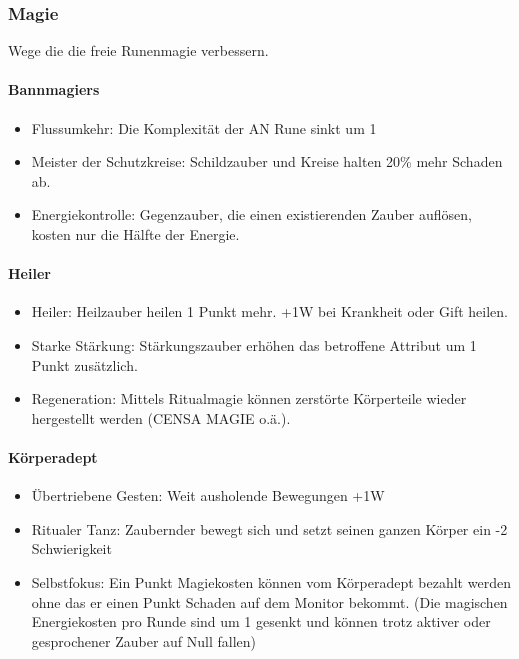 \documentclass{article}
\begin{document}
\subsubsection{Magie}

Wege die die freie Runenmagie verbessern.

\paragraph{Bannmagiers}

\begin{itemize}
\item Flussumkehr: Die Komplexität der AN Rune sinkt um 1
\item Meister der Schutzkreise: Schildzauber und Kreise halten 20\% mehr Schaden ab.
\item Energiekontrolle: Gegenzauber, die einen existierenden Zauber auflösen, kosten nur die Hälfte der Energie.
\end{itemize}

\paragraph{Heiler}

\begin{itemize}
\item Heiler: Heilzauber heilen 1 Punkt mehr. +1W bei Krankheit oder Gift heilen.
\item Starke Stärkung: Stärkungszauber erhöhen das betroffene Attribut um 1 Punkt zusätzlich.
\item Regeneration: Mittels Ritualmagie können zerstörte Körperteile wieder hergestellt werden (CENSA MAGIE o.ä.).
\end{itemize}

\paragraph{Körperadept}

\begin{itemize}
\item Übertriebene Gesten: Weit ausholende Bewegungen +1W
\item Ritualer Tanz: Zaubernder bewegt sich und setzt seinen ganzen Körper ein -2 Schwierigkeit
\item Selbstfokus: Ein Punkt Magiekosten können vom Körperadept bezahlt werden ohne das er einen Punkt Schaden auf dem Monitor bekommt. (Die magischen Energiekosten pro Runde sind um 1 gesenkt und können trotz aktiver oder gesprochener Zauber auf Null fallen)
\end{itemize}
\end{document}
